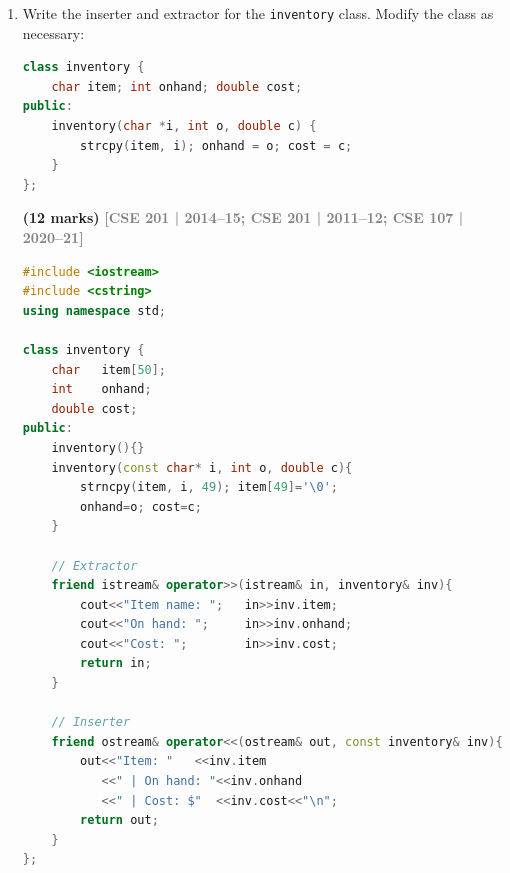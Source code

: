 \documentclass[12pt,a3paper]{article}
\newcommand{\yr}[1]{\hfill\textcolor{gray}{\small\textbf{[#1]}}}
\newcommand{\mk}[1]{\textcolor{orange!70!black}{\small\textbf{(#1 marks)}}}
\begin{document}
\begin{enumerate}
\begin{tcolorbox}
Output \texttt{123.456\%\%\%} means: precision 3 decimal places,
left-justified, field width~9, filled with \texttt{'\%'}:

\begin{lstlisting}[language=C++]
#include <iostream>
#include <iomanip>
using namespace std;

ostream& setup(ostream& out){
    out << setprecision(3) << fixed<< left<< setw(9)<< setfill('%');
    return out;
}

int main(){
    cout << setup << 123.45678 << "\n";
    // Output: 123.456%%% (7 chars used, 2 padding '%')
    // Adjust width/precision to get exact 123.456%%%
    return 0;
}
\end{lstlisting}

\end{tcolorbox}


\item Write the inserter and extractor for the \texttt{inventory} class. Modify the class as necessary:
\begin{lstlisting}[language=C++]
class inventory {
    char item; int onhand; double cost;
public:
    inventory(char *i, int o, double c) {
        strcpy(item, i); onhand = o; cost = c;
    }
};
\end{lstlisting}
\mk{12}
\yr{CSE 201 | 2014--15; CSE 201 | 2011--12; CSE 107 | 2020--21}

\begin{tcolorbox}[enhanced,breakable,ansbox,colback=cA!4,colframe=cA,
  boxrule=0.8pt,arc=5pt,
  title={\textbf{Answer --- inventory class inserter and extractor}},
  fonttitle=\bfseries\color{white},colbacktitle=cA]

\begin{lstlisting}[language=C++]
#include <iostream>
#include <cstring>
using namespace std;

class inventory {
    char   item[50];
    int    onhand;
    double cost;
public:
    inventory(){}
    inventory(const char* i, int o, double c){
        strncpy(item, i, 49); item[49]='\0';
        onhand=o; cost=c;
    }

    // Extractor
    friend istream& operator>>(istream& in, inventory& inv){
        cout<<"Item name: ";   in>>inv.item;
        cout<<"On hand: ";     in>>inv.onhand;
        cout<<"Cost: ";        in>>inv.cost;
        return in;
    }

    // Inserter
    friend ostream& operator<<(ostream& out, const inventory& inv){
        out<<"Item: "   <<inv.item
           <<" | On hand: "<<inv.onhand
           <<" | Cost: $"  <<inv.cost<<"\n";
        return out;
    }
};


\end{lstlisting}
\end{tcolorbox}
\end{enumerate}
\end{document}
